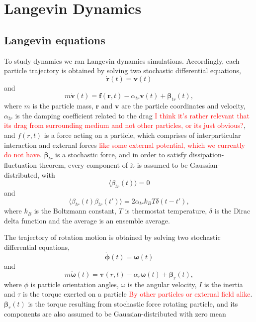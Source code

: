 \section{Langevin Dynamics}
\label{sec:langevin_dynamics}

\subsection{Langevin equations}
\label{subsec:langevin_equations}
To study dynamics we ran Langevin dynamics simulations. Accordingly, each particle trajectory is obtained by solving two stochastic differential equations,
\begin{equation}
\label{eq:langevin_theory_1}
	\dot{\boldsymbol{r}}(t) = \boldsymbol{v}(t)
\end{equation}
and
\begin{equation}
\label{eq:langevin_theory_2}
	m \dot{\boldsymbol{v}}(t) = \boldsymbol{f}(\boldsymbol{r}, t) - \alpha_{tr} \boldsymbol{v}(t) + \boldsymbol{\beta}_{tr}(t)
	,
\end{equation}
where $m$ is the particle mass, $\boldsymbol{r}$ and $\boldsymbol{v}$ are the particle coordinates and velocity,  $\alpha_{tr}$ is the damping coefficient related to the drag \textcolor{red}{I think it's rather relevant that its drag from surrounding medium and not other particles, or its just obvious?}, and $f(r, t)$ is a force acting on a particle, which comprises of interparticular interaction and external forces \textcolor{red}{like some external potential, which we currently do not have}. $\boldsymbol{\beta}_{tr}$ is a stochastic force, and in order to satisfy dissipation-fluctuation theorem, every component of it is assumed to be Gaussian-distributed, with
\begin{equation}
\langle\beta_{tr}(t)\rangle = 0
\end{equation}
and
\begin{equation}
\label{eq:stochastic_term_dispersion}
	\langle\beta_{tr}(t)\beta_{tr}(t')\rangle = 2 \alpha_{tr} k_B 		T\delta(t - t')
	,
\end{equation}
where $k_B$ is the Boltzmann constant, $T$ is thermostat temperature, $\delta$ is the Dirac delta function and the average is an ensemble average.

The trajectory of rotation motion is obtained by solving two stochastic differential equations,
\begin{equation}
\label{eq:langevin_theory_3}
	\dot{\boldsymbol{\phi}}(t) = \boldsymbol{\omega}(t)
\end{equation}
and
\begin{equation}
\label{eq:langevin_theory_4}
	m \dot{\boldsymbol{\omega}}(t) = \boldsymbol{\tau}(r, t) - \alpha_{r} \boldsymbol{\omega}(t) + \boldsymbol{\beta}_{r}(t)
	,
\end{equation}
where $\phi$ is particle orientation angles, $\omega$ is the angular velocity, $I$ is the inertia and $\tau$ is the torque exerted on a particle \textcolor{red}{By other particles or external field alike}. $\boldsymbol{\beta}_{r}(t)$ is the torque resulting from stochastic force rotating particle, and its components are also assumed to be Gaussian-distributed with zero mean

